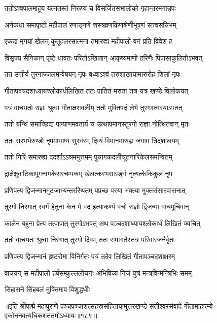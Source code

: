 \twolineshloka
{ततोऽश्वपालमाहूय यत्नतस्तं निरूप्य च}
{विसर्जितसभालोको गृहान्तरमगान्नृपः} %

\twolineshloka
{अनेकधा समापृष्टो महीपालं रणाङ्गणे}
{शस्त्रव्रणकिणश्रेणीभूषणं सत्त्वसन्निभम्} %

\twolineshloka
{एकदा मृगयां खेलन् कुतूहलरसात्मना}
{तमारुह्य महीपालो वनं प्रति विवेश ह} %

\twolineshloka
{विसृज्य सैनिकान् पृष्टे धावतः परितोऽखिलान्}
{आकृष्यमाणो हरिणैः पिपासाकुलितोऽभवत्} %

\twolineshloka
{तत उत्तीर्य तुरगाज्जलमन्वेषयन् नृपः}
{बध्वाऽश्वं तरुशाखायामारुरोह शिलां नृपः} %

\twolineshloka
{गीतापञ्चदशाध्यायश्लोकार्धलिखितं ततः}
{पातितं मरुता तत्र यत्र खण्डे विलोकयत्} %

\twolineshloka
{पत्रं वाचयतो राज्ञः श्रुत्वा गीताक्षरावलीम्}
{ततो मुक्तिपदं लेभे तुरगस्त्वरयाऽपतत्} %

\twolineshloka
{ततो ग्रन्थिं समाच्छिद्य पल्याणमवतार्य च}
{उत्थापमानस्तुरगो राज्ञा नोत्थितवान् मृतः} %

\twolineshloka
{ततः सरभभेरुण्डो नृपमाभाष्य सुस्वरम्}
{दिव्यं विमानमारुह्य जगाम त्रिदशालयम्} %

\twolineshloka
{ततो गिरिं समारुह्य ददर्शाऽऽश्रममुत्तमम्}
{पुन्नागकदलीचूतनारिकेलसमन्वितम्} %

\twolineshloka
{द्राक्षेक्षुवाटिकापूगनागकेसरचम्पकम्}
{खेलत्करभसारङ्गं नृत्यत्केकिकुलं नृपः} %

\twolineshloka
{प्रणिपत्य द्विजन्मानमुटजाभ्यन्तरस्थितम्}
{पप्रच्छ परया भक्त्या मुक्तसंसारवासनात्} %

\twolineshloka
{तुरगो निरगात् स्वर्गं हेतुना केन मे वद}
{इत्याकर्ण्य वचो राज्ञो द्विजन्मा वाचमूचिवान्} %

\twolineshloka
{कालेन बहुना प्रेत्य तत्पापात् तुरगोऽभवत्}
{अथ पञ्चदशाध्यायश्लोकार्धं लिखितं क्वचित्} %

\twolineshloka
{ततो वाचयतः श्रुत्वा निरगात् तुरगो दिवम्}
{ततः समागतैस्तत्र परिवारजनैर्वृतः} %

\twolineshloka
{प्रणिपत्य द्विजन्मानं हृष्टरोमा विनिर्गतः}
{पत्रं तदेव लिखितं गीतापञ्चदशाक्षरम्} %

\twolineshloka
{वाचयन् स महीपालो हर्षसम्फुल्ललोचनः}
{अभिषिच्य निजं पुत्रं मन्त्रविन्मन्त्रिभिः समम्} %

\onelineshloka
{सिंहासने सिंहबलं मुक्तिमाप विशुद्धधीः} %

॥इति श्रीपाद्मे महापुराणे पञ्चपञ्चाशत्सहस्रसंहितायामुत्तरखण्डे सतीश्वरसंवादे गीतामाहात्म्ये एकोननवत्यधिकशततमोऽध्यायः॥१८९॥

